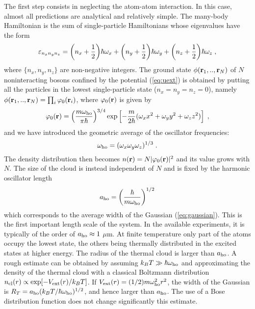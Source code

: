 The first step consists in neglecting the atom-atom interaction.
In this case, almost all predictions are analytical and relatively
simple. The many-body Hamiltonian is the sum of single-particle
Hamiltonians whose eigenvalues have the form
\begin{equation}
\varepsilon_{n_x n_y n_z} = \bigg({n_x + {1\over 2}}\bigg)
\hbar \omega_x  + \bigg({n_y + {1\over 2}}\bigg) \hbar \omega_y
+ \bigg({n_z + {1\over 2}}\bigg) \hbar \omega_z \; ,
\label{eq:spectrumho}
\end{equation}
where $\{ n_x, n_y, n_z \} $ are non-negative integers. The ground
state $\phi({\bf r}_1,..,{\bf r}_N)$ of $N$ noninteracting bosons 
confined by the potential (\ref{eq:uext}) is obtained by putting 
all the particles in the lowest single-particle state 
($n_x=n_y=n_z=0$), namely $\phi({\bf r}_1,..,{\bf r}_N)=
\prod_i\varphi_0({\bf r}_i)$,
where $\varphi_0({\bf r})$ is given by 
\begin{equation}  
\varphi_0 ({\bf r}) = \left( { m \omega_{\rm ho}  \over
\pi \hbar } \right)^{3/4} \exp \left[ - {m \over
2 \hbar } (\omega_x x^2 + \omega_y y^2 + \omega_z z^2)
\right]  \; ,
\label{eq:gaussian}
\end{equation}
and we have introduced the geometric average of the oscillator
frequencies:
\begin{equation}
\omega_{\rm ho} = (\omega_x \omega_y \omega_z)^{1/3} \;.
\label{omegaho}
\end{equation}
The density distribution then becomes $n({\bf r})= N|\varphi_0({\bf r})|^2$
and its value grows with $N$. The size of the cloud is instead independent 
of $N$ and is fixed by the harmonic oscillator length
\begin{equation}
a_{\rm ho} = \left( {\hbar \over m \omega_{\rm ho} } \right)^{1/2}
\label{eq:aho}
\end{equation}
which corresponds to the average width of the Gaussian
(\ref{eq:gaussian}). This is the first important length scale
of the system.  In the available experiments, it is typically
of the order of $a_{\rm ho} \approx 1$ $\mu$m.  At finite temperature 
only part of the atoms occupy the lowest state, the others
being thermally distributed in the excited states at higher
energy. The radius of the thermal cloud is larger than $a_{\rm ho}$.
A rough estimate can be obtained by assuming $k_B T \gg \hbar
\omega_{\rm ho}$ and approximating the density of the thermal cloud
with a classical Boltzmann distribution $n_{\rm cl} (r) \propto
\exp[-V_{\rm ext}(r)/k_BT]$. If $V_{\rm ext}(r)=(1/2) 
m\omega_{\rm ho}^2 r^2$, the width of the Gaussian is 
$R_T = a_{\rm ho} (k_BT/\hbar \omega_{\rm ho})^{1/2}$, 
and hence larger than $a_{\rm ho}$. The use of a Bose
distribution function does not change significantly this
estimate. 

